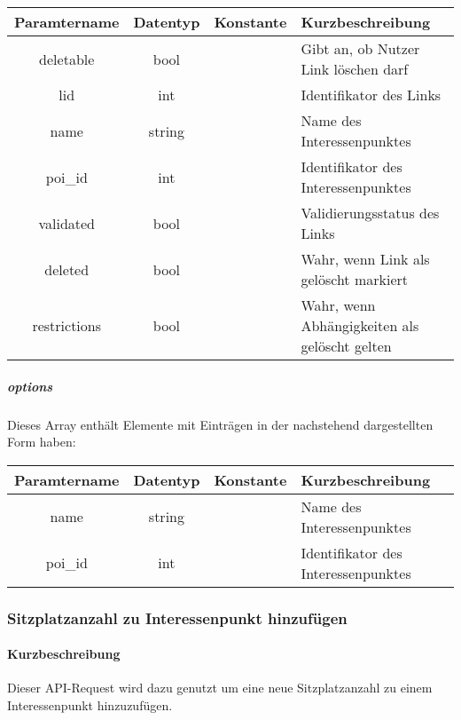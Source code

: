 \begin{table}[H]
	\begin{tabular}{|c|c|c|p{6.5cm}|}
		\hline
		\textbf{Paramtername} & \textbf{Datentyp} & \textbf{Konstante} & \textbf{Kurzbeschreibung}    \\ \hline
		deletable              & bool            &                 & Gibt an, ob Nutzer Link löschen darf \\ \hline
		lid                    & int             &                 & Identifikator des Links\\ \hline
		name                   & string          &                 & Name des Interessenpunktes \\ \hline
		poi\_id                & int             &                 & Identifikator des Interessenpunktes \\ \hline
		validated              & bool            &                 & Validierungsstatus des Links \\ \hline
		deleted                & bool            &                 & Wahr, wenn Link als gelöscht markiert \\ \hline
		restrictions           & bool            &                 & Wahr, wenn Abhängigkeiten als gelöscht gelten \\ \hline
	\end{tabular}
\end{table}
\subparagraph{options}Dieses Array enthält Elemente mit Einträgen in der nachstehend dargestellten Form haben:
\begin{table}[H]
	\begin{tabular}{|c|c|c|p{6.5cm}|}
		\hline
		\textbf{Paramtername} & \textbf{Datentyp} & \textbf{Konstante} & \textbf{Kurzbeschreibung}    \\ \hline
		name                   & string          &                 & Name des Interessenpunktes \\ \hline
		poi\_id                & int             &                 & Identifikator des Interessenpunktes \\ \hline
	\end{tabular}
\end{table}
\subsubsection{Sitzplatzanzahl zu Interessenpunkt hinzufügen}
\paragraph{Kurzbeschreibung}Dieser API-Request wird dazu genutzt um eine neue Sitzplatzanzahl zu einem Interessenpunkt hinzuzufügen.

